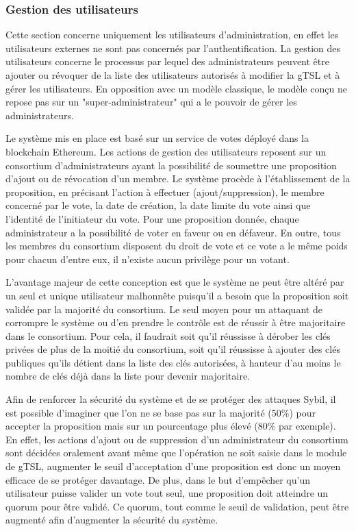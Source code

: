 \documentclass{tnreport}
\begin{document}
\subsubsection{Gestion des utilisateurs}

Cette section concerne uniquement les utilisateurs d'administration, en effet les utilisateurs externes ne sont pas concernés par l'authentification.
La gestion des utilisateurs concerne le processus par lequel des administrateurs peuvent être ajouter ou révoquer de la liste des utilisateurs autorisés à modifier la gTSL et à gérer les utilisateurs. 
En opposition avec un modèle classique, le modèle conçu ne repose pas sur un "super-administrateur" qui a le pouvoir de gérer les administrateurs. 

Le système mis en place est basé sur un service de votes déployé dans la blockchain Ethereum. Les actions de gestion des utilisateurs reposent sur un consortium d'administrateurs ayant la possibilité de soumettre une proposition d'ajout ou de révocation d'un membre. Le système procède à l'établissement de la proposition, en précisant l'action à effectuer (ajout/suppression), le membre concerné par le vote, la date de création, la date limite du vote ainsi que l'identité de l'initiateur du vote. Pour une proposition donnée, chaque administrateur a la possibilité de voter en faveur ou en défaveur. En outre, tous les membres du consortium disposent du droit de vote et ce vote a le même poids pour chacun d'entre eux, il n'existe aucun privilège pour un votant.

L'avantage majeur de cette conception est que le système ne peut être altéré par un seul et unique utilisateur malhonnête puisqu'il a besoin que la proposition soit validée par la majorité du consortium. Le seul moyen pour un attaquant de corrompre le système ou d'en prendre le contrôle est de réussir à être majoritaire dans le consortium. Pour cela, il faudrait soit qu'il réussisse à dérober les clés privées de plus de la moitié du consortium, soit qu'il réussisse à ajouter des clés publiques qu'ils détient dans la liste des clés autorisées, à hauteur d'au moins le nombre de clés déjà dans la liste pour devenir majoritaire. 

Afin de renforcer la sécurité du système et de se protéger des attaques Sybil, il est possible d'imaginer que l'on ne se base pas sur la majorité (50\%) pour accepter la proposition mais sur un pourcentage plus élevé (80\% par exemple). En effet, les actions d'ajout ou de suppression d'un administrateur du consortium sont décidées oralement avant même que l'opération ne soit saisie dans le module de gTSL, augmenter le seuil d'acceptation d'une proposition est donc un moyen efficace de se protéger davantage. De plus, dans le but d'empêcher qu'un utilisateur puisse valider un vote tout seul, une proposition doit atteindre un quorum pour être validé. Ce quorum, tout comme le seuil de validation, peut être augmenté afin d'augmenter la sécurité du système.
\end{document}
